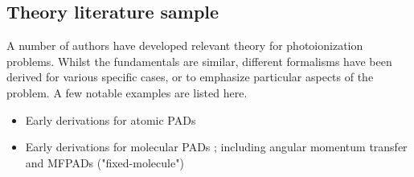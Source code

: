 \subsection{Theory literature sample\label{sec:theory-lit}}

A number of authors have developed relevant theory for photoionization problems. Whilst the fundamentals are similar, different formalisms have been derived for various specific cases, or to emphasize particular aspects of the problem. A few notable examples are listed here.

\begin{itemize}
\item Early derivations for atomic PADs \cite{Cherepkov1979,Cooper1968,Cooper1969,Klar1982}
\item Early derivations for molecular PADs \cite{Buckingham1970,Tully1968}; including angular momentum transfer \cite{Fano1972} and MFPADs ("fixed-molecule") \cite{Dill1976}
\end{itemize}